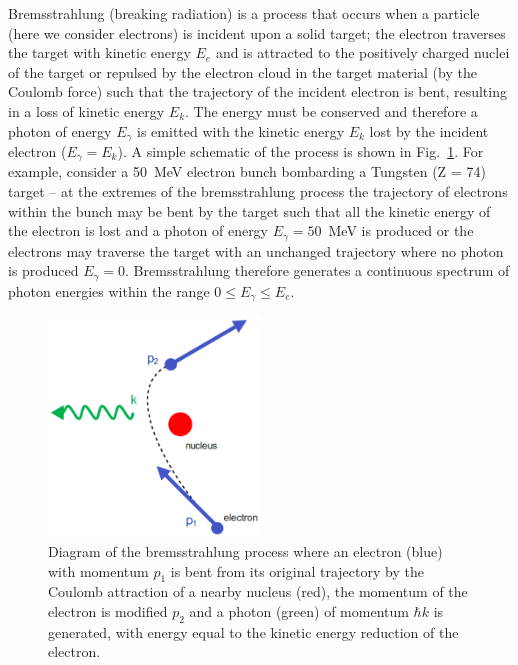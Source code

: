 \documentclass[../main.tex]{subfiles}
\begin{document}
Bremsstrahlung (breaking radiation) is a process that occurs when a particle (here we consider electrons) is incident upon a solid target; the electron traverses the target with kinetic energy $E_{e}$ and is attracted to the positively charged nuclei of the target or repulsed by the electron cloud in the target material (by the Coulomb force) such that the trajectory of the incident electron is bent, resulting in a loss of kinetic energy $E_{k}$. The energy must be conserved and therefore a photon of energy $E_{\gamma}$ is emitted with the kinetic energy $E_{k}$ lost by the incident electron ($E_{\gamma}=E_{k}$). A simple schematic of the process is shown in Fig.~\ref{fig:bremsstrahlung_diagram}. For example, consider a 50~\si{\mega\electronvolt} electron bunch bombarding a Tungsten (Z = 74) target -- at the extremes of the bremsstrahlung process the trajectory of electrons within the bunch may be bent by the target such that all the kinetic energy of the electron is lost and a photon of energy $E_{\gamma}=50$~\si{\mega\electronvolt} is produced or the electrons may traverse the target with an unchanged trajectory where no photon is produced $E_{\gamma}=0$. Bremsstrahlung therefore generates a continuous spectrum of photon energies within the range $0 \leq E_{\gamma} \leq E_{e}$.
\begin{figure}[!h]
\centering
\includegraphics[width=0.5\textwidth]{Figures/DIANA_Inverse_Compton_Source_Design/Bremsstrahlung_fixed.pdf}
\caption{Diagram of the bremsstrahlung process where an electron (blue) with momentum $p_{1}$ is bent from its original trajectory by the Coulomb attraction of a nearby nucleus (red), the momentum of the electron is modified $p_{2}$ and a photon (green) of momentum $\hbar k$ is generated, with energy equal to the kinetic energy reduction of the electron.}
\label{fig:bremsstrahlung_diagram}
\end{figure}
\end{document}
